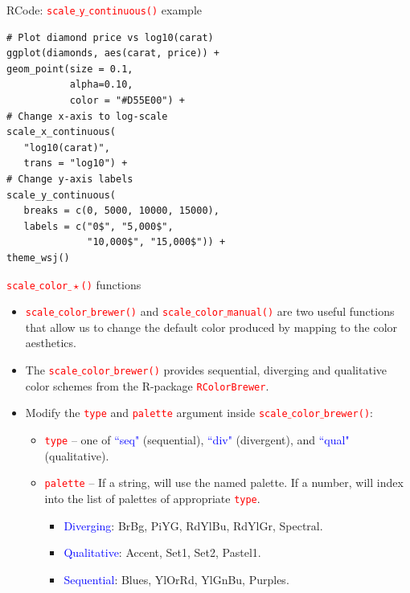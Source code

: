 \documentclass{beamer}
\begin{document}
\begin{frame}[fragile]{RCode: \texttt{\textcolor{red}{scale$\_$y$\_$continuous()}} example}
\begin{lstlisting}
# Plot diamond price vs log10(carat)
ggplot(diamonds, aes(carat, price)) +
geom_point(size = 0.1, 
           alpha=0.10, 
           color = "#D55E00") +
# Change x-axis to log-scale
scale_x_continuous(
   "log10(carat)",
   trans = "log10") +
# Change y-axis labels
scale_y_continuous(
   breaks = c(0, 5000, 10000, 15000),
   labels = c("0$", "5,000$", 
              "10,000$", "15,000$")) +
theme_wsj()
\end{lstlisting}
\end{frame}

\begin{frame}{\texttt{\textcolor{red}{scale$\_$color$\_\star$()}} functions}
\begin{itemize}
\item \texttt{\textcolor{red}{scale$\_$color$\_$brewer()}} and \texttt{\textcolor{red}{scale$\_$color$\_$manual()}} are two useful functions that allow us to change the default color produced by mapping to the color aesthetics. 

\item<2-> The \texttt{\textcolor{red}{scale$\_$color$\_$brewer()}} provides sequential, diverging and qualitative color schemes from the R-package \texttt{\textcolor{red}{RColorBrewer}}.

\item<3-> Modify the \texttt{\textcolor{red}{type}} and \texttt{\textcolor{red}{palette}} argument inside \texttt{\textcolor{red}{scale$\_$color$\_$brewer()}}:
\begin{itemize}
\item \texttt{\textcolor{red}{type}} -- one of \textcolor{blue}{``seq"} (sequential), \textcolor{blue}{``div"} (divergent), and \textcolor{blue}{``qual"} (qualitative).
\item \texttt{\textcolor{red}{palette}} -- If a string, will use the named palette. If a number, will index into the list of palettes of appropriate \texttt{\textcolor{red}{type}}.
\begin{itemize}
\item \textcolor{blue}{Diverging}: BrBg, PiYG, RdYlBu, RdYlGr, Spectral.
\item \textcolor{blue}{Qualitative}: Accent, Set1, Set2, Pastel1.
\item \textcolor{blue}{Sequential}: Blues, YlOrRd, YlGnBu, Purples.
\end{itemize}
\end{itemize}
\end{itemize}
\end{frame}
\end{document}
